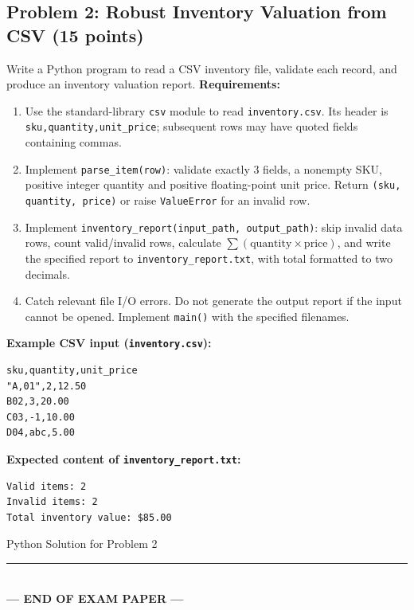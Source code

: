 \documentclass[11pt,a4paper]{article}
\begin{document}
\subsection*{Problem 2: Robust Inventory Valuation from CSV (15 points)}
Write a Python program to read a CSV inventory file, validate each record, and produce an inventory valuation report.
\textbf{Requirements:}
\begin{enumerate}[label=\arabic*.,leftmargin=2em,itemsep=2pt]
\item Use the standard-library \texttt{csv} module to read \texttt{inventory.csv}. Its header is \texttt{sku,quantity,unit\_price}; subsequent rows may have quoted fields containing commas.
\item Implement \texttt{parse\_item(row)}: validate exactly 3 fields, a nonempty SKU, positive integer quantity and positive floating-point unit price. Return \texttt{(sku, quantity, price)} or raise \texttt{ValueError} for an invalid row.
\item Implement \texttt{inventory\_report(input\_path, output\_path)}: skip invalid data rows, count valid/invalid rows, calculate $\sum (\text{quantity}\times\text{price})$, and write the specified report to \texttt{inventory\_report.txt}, with total formatted to two decimals.
\item Catch relevant file I/O errors. Do not generate the output report if the input cannot be opened. Implement \texttt{main()} with the specified filenames.
\end{enumerate}
\textbf{Example CSV input (\texttt{inventory.csv}):}
\begin{lstlisting}
sku,quantity,unit_price
"A,01",2,12.50
B02,3,20.00
C03,-1,10.00
D04,abc,5.00
\end{lstlisting}
\textbf{Expected content of \texttt{inventory\_report.txt}:}
\begin{lstlisting}
Valid items: 2
Invalid items: 2
Total inventory value: $85.00
\end{lstlisting}
\begin{answerbox}[height=9cm]{Python Solution for Problem 2}\end{answerbox}
\vfill
\begin{center}\rule{0.5\textwidth}{0.4pt}\\[1mm]
\textbf{\color{primaryblue}--- END OF EXAM PAPER ---}
\end{center}
\end{document}
